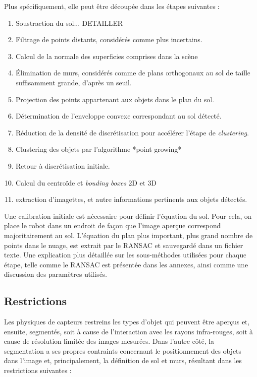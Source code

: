Plus spécifiquement, elle peut être découpée dans les étapes suivantes
:

\begin{enumerate}
\item Soustraction du sol... {\color{blue} DETAILLER}

\item Filtrage de points distants, considérés comme plus incertains.

\item Calcul de la normale des superficies comprises dans la scène

\item Élimination de murs, considérés comme de plans orthogonaux au
sol de taille suffisamment grande, d'après un seuil.

\item Projection des points appartenant aux objets dans le plan du
sol.

\item Détermination de l’enveloppe convexe correspondant au sol détecté.

\item Réduction de la densité de discrétisation pour accélérer l'étape
de \textit{clustering}.

\item Clustering des objets par l'algorithme *point growing*

\item Retour à discrétisation initiale.

\item Calcul du centroïde et \textit{bouding boxes} 2D et 3D

\item extraction d’imagettes, et autre informations pertinents aux
objets détectés.
\end{enumerate}

Une calibration initiale est nécessaire pour définir l'équation du
sol. Pour cela, on place le robot dans un endroit de façon que l'image
aperçue correspond majoritairement au sol. L’équation du plan plus
important, plus grand nombre de points dans le nuage, est extrait par
le RANSAC et sauvegardé dans un fichier texte. Une explication plus
détaillée sur les sous-méthodes utilisées pour chaque étape, telle
comme le RANSAC est présentée dans les annexes, ainsi comme une
discussion des paramètres utilisés.

\subsection{Restrictions} Les physiques de capteurs restreins les
types d'objet qui peuvent être aperçus et, ensuite, segmentés, soit à
cause de l'interaction avec les rayons infra-rouges, soit à cause de
résolution limitée des images mesurées. Dans l'autre côté, la
segmentation a ses propres contraints concernant le positionnement des
objets dans l'image et, principalement, la définition de sol et murs,
résultant dans les restrictions suivantes :

